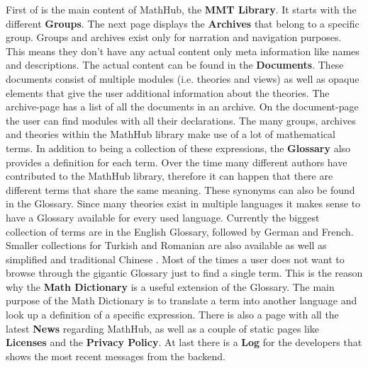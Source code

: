 \documentclass[11pt,a4paper]{article}
\begin{document}
First of is the main content of MathHub, the \textbf{MMT Library}.
It starts with the different \textbf{Groups}.
The next page displays the \textbf{Archives} that belong to a specific group.
Groups and archives exist only for narration and navigation purposes.
This means they don't have any actual content only meta information like names and descriptions.
The actual content can be found in the \textbf{Documents}.
These documents consist of multiple modules (i.e. theories and views) as well as opaque elements that give the user additional information about the theories.
The archive-page has a list of all the documents in an archive.
On the document-page the user can find modules with all their declarations.
\newline \newline
The many groups, archives and theories within the MathHub library make use of a lot of mathematical terms.
In addition to being a collection of these expressions, the \textbf{Glossary} also provides a definition for each term.
Over the time many different authors have contributed to the MathHub library, therefore it can happen that there are different terms that share the same meaning.
These synonyms can also be found in the Glossary.
Since many theories exist in multiple languages it makes sense to have a Glossary available for every used language.
Currently the biggest collection of terms are in the English Glossary, followed by German and French.
Smaller collections for Turkish and Romanian are also available as well as simplified and traditional Chinese \cite{smglom}.
\newline \newline
Most of the times a user does not want to browse through the gigantic Glossary just to find a single term.
This is the reason why the \textbf{Math Dictionary} is a useful extension of the Glossary.
The main purpose of the Math Dictionary is to translate a term into another language and look up a definition of a specific expression.
\newline \newline
There is also a page with all the latest \textbf{News} regarding MathHub, as well as a couple of static pages like \textbf{Licenses} and the \textbf{Privacy Policy}.
At last there is a \textbf{Log} for the developers that shows the most recent messages from the backend.
\end{document}
